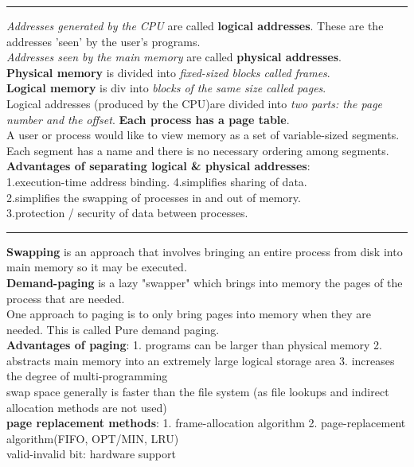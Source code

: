 \documentclass[8pt,a4paper,landscape]{article}
\begin{document}
\begin{spacing}{-1}
\begin{multicols*}{3}
\hrule \noindent
\textit{Addresses generated by the CPU} are called \textbf{logical addresses}. 
These are the addresses 'seen' by the user's programs.\\
\textit{Addresses seen by the main memory} are called \textbf{physical addresses}. \\
\textbf{Physical memory} is divided into \textit{fixed-sized blocks called frames}. \\
\textbf{Logical memory} is div into \textit{blocks of the same size called pages}. \\
Logical addresses (produced by the CPU)are divided into \textit{two parts: the page number and the offset}. 
\textbf{Each process has a page table}. \\
A user or process would like to view memory as a set of variable-sized segments. Each segment has a name and there is no necessary ordering among segments. \\
\textbf{Advantages of separating logical \& physical addresses}: \\
1.execution-time address binding.  4.simplifies sharing of data. \\
2.simplifies the swapping of processes in and out of memory. \\
3.protection / security of data between processes. \\

\hrule \noindent
\textbf{Swapping} is an approach that involves bringing an entire process from disk into main memory so it may be executed. \\
\textbf{Demand-paging} is a lazy "swapper" which brings into memory the pages of the process that are needed. \\
One approach to paging is to only bring pages into memory when they are needed. This is called Pure demand paging. \\
\textbf{Advantages of paging}:
1. programs can be larger than physical memory
2. abstracts main memory into an extremely large logical storage area
3. increases the degree of multi-programming \\
swap space generally is faster than the file system (as file lookups and indirect allocation methods are not used) \\
\textbf{page replacement methods}:
1. frame-allocation algorithm
2. page-replacement algorithm(FIFO, OPT/MIN, LRU)\\
valid-invalid bit: hardware support \\


\end{multicols*}
\end{spacing}
\end{document}
